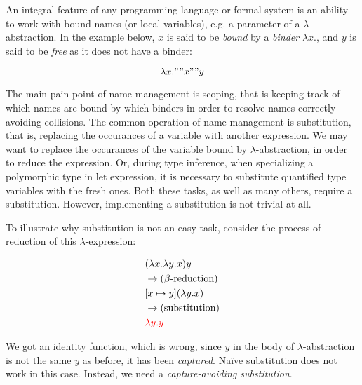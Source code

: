 
\section{}

An integral feature of any programming language or formal system is an ability to work with bound names (or local variables), e.g. a parameter of a $\lambda$-abstraction. In the example below, $x$ is said to be \textit{bound} by a \textit{binder} $\lambda x.$, and $y$ is said to be \textit{free} as it does not have a binder:

$$
\lambda x." "x" "y
$$

The main pain point of name management is scoping, that is keeping track of which names are bound by which binders in order to resolve names correctly avoiding collisions. The common operation of name management is substitution, that is, replacing the occurances of a variable with another expression. We may want to replace the occurances of the variable bound by $\lambda$-abstraction, in order to reduce the expression. Or, during type inference, when specializing a polymorphic type in let expression, it is necessary to substitute quantified type variables with the fresh ones. Both these tasks, as well as many others, require a substitution. However, implementing a substitution is not trivial at all.

To illustrate why substitution is not an easy task, consider the process of reduction of this $\lambda$-expression:

\begin{align*}
  & (\lambda x. \lambda y. x) y \\
  & \rightarrow \text{($\beta$-reduction)} \\
  & [x \mapsto y](\lambda y. x) \\
  & \rightarrow \text{(substitution)} \\
  & \textcolor{red}{\lambda y. y}
\end{align*}

We got an identity function, which is wrong, since $y$ in the body of $\lambda$-abstraction is not the same $y$ as before, it has been \textit{captured}. Naïve substitution does not work in this case. Instead, we need a \textit{capture-avoiding substitution}.

